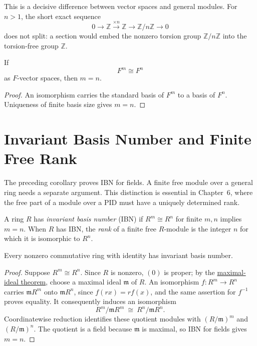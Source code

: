 This is a decisive difference between vector spaces and general modules.
For \(n>1\), the short exact sequence
\[
0\longrightarrow\mathbb Z\xrightarrow{\times n}\mathbb Z
\longrightarrow\mathbb Z/n\mathbb Z\longrightarrow0
\]
does not split: a section would embed the nonzero torsion group
\(\mathbb Z/n\mathbb Z\) into the torsion-free group \(\mathbb Z\).

\begin{corollary}
If
\[
F^m\cong F^n
\]
as \(F\)-vector spaces, then \(m=n\).
\end{corollary}
\begin{proof}
An isomorphism carries the standard basis of \(F^m\) to a basis of \(F^n\).
Uniqueness of finite basis size gives \(m=n\).
\end{proof}

\section{Invariant Basis Number and Finite Free Rank}
The preceding corollary proves IBN for fields. A finite free module over a
general ring needs a separate argument. This distinction is essential in
Chapter~6, where the free part of a module over a PID must have a uniquely
determined rank.

\begin{definition}
A ring \(R\) has \emph{invariant basis number} (IBN) if
\(R^m\cong R^n\) for finite \(m,n\) implies \(m=n\). When \(R\) has IBN,
the \emph{rank} of a finite free \(R\)-module is the integer \(n\) for which
it is isomorphic to \(R^n\).
\end{definition}

\begin{theorem}
Every nonzero commutative ring with identity has invariant basis number.
\end{theorem}
\begin{proof}
Suppose \(R^m\cong R^n\). Since \(R\) is nonzero, \((0)\) is proper; by the
\hyperref[thm:maximal-ideal-existence]{maximal-ideal theorem}, choose a
maximal ideal \(\mathfrak m\) of \(R\). An isomorphism \(f:R^m\to R^n\) carries
\(\mathfrak mR^m\) onto \(\mathfrak mR^n\), since
\(f(rx)=rf(x)\), and the same assertion for \(f^{-1}\) proves equality.
It consequently induces an isomorphism
\[
R^m/\mathfrak mR^m\ \cong\ R^n/\mathfrak mR^n.
\]
Coordinatewise reduction identifies these quotient modules with
\((R/\mathfrak m)^m\) and \((R/\mathfrak m)^n\). The quotient is a field
because \(\mathfrak m\) is maximal, so IBN for fields gives \(m=n\).
\end{proof}


